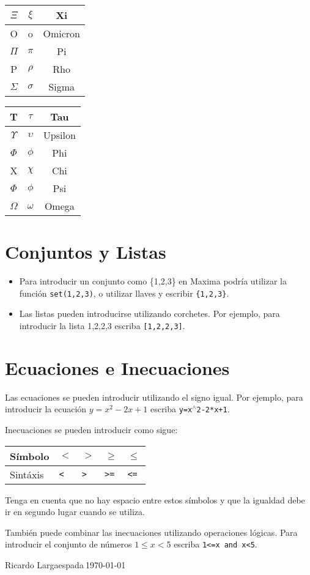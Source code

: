 \documentclass[a4paper]{article}
\newcommand{\stack}[1]{{\color{red}\tt #1}}
\begin{document}
\begin{multicols}{2}
\begin{table}[H]
\begin{minipage}{0.22\linewidth}
\begin{tabular}{|c|c|c|}
$\Xi$ & $\xi$ & Xi \\ \hline
O & o & Omicron \\ \hline
$\Pi$ & $\pi$ & Pi \\ \hline
P & $\rho$ & Rho \\ \hline
$\Sigma$ & $\sigma$ & Sigma \\ \hline
\end{tabular}
\end{minipage}
\hspace{0.2cm}
\begin{minipage}{0.22\linewidth}
\centering
\begin{tabular}{|c|c|c|} \hline
T & $\tau$ & Tau \\ \hline
$\Upsilon$ & $\upsilon$ & Upsilon \\ \hline
$\Phi$ & $\phi$ & Phi \\ \hline
X & $\chi$ & Chi \\ \hline
$\Phi$ & $\phi$ & Psi \\ \hline
$\Omega$ & $\omega$ & Omega \\ \hline
\end{tabular}
\end{minipage}
\end{table}

\section*{Conjuntos y Listas}
\begin{itemize}
\item Para introducir un conjunto como \{1,2,3\} en Maxima podría utilizar la función \stack{set(1,2,3)}, o utilizar llaves y escribir \stack{\{1,2,3\}}.
\item Las listas pueden introducirse utilizando corchetes. Por ejemplo, para introducir la lista 1,2,2,3 escriba \stack{[1,2,2,3]}.
\end{itemize}

\section*{Ecuaciones e Inecuaciones}
Las ecuaciones se pueden introducir utilizando el signo igual. Por ejemplo, para introducir la ecuación $y=x^2-2x+1$ escriba \stack{y=x$^{\wedge}$2-2*x+1}.

Inecuaciones se pueden introducir como sigue:
\begin{center}
\begin{tabular}{l|l|l|l|l}
Símbolo  & $<$ & $>$ & $\geq$ & $\leq$\\
\hline
Sintáxis & \stack{<} & \stack{>} & \stack{>=} & \stack{<=}
\end{tabular}
\end{center}

Tenga en cuenta que no hay espacio entre estos símbolos y que la igualdad debe ir en segundo lugar cuando se utiliza.

También puede combinar las inecuaciones utilizando operaciones lógicas.  Para introducir el conjunto de números $1\leq x <5$ escriba \stack{1<=x and x<5}.
\end{multicols}

{\tiny \sc Ricardo Largaespada}$~$\hfill{\tiny \today}
\end{document}
